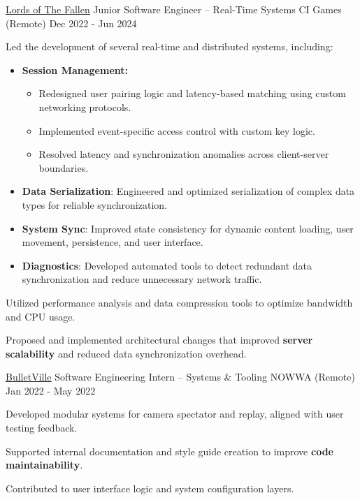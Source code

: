 \begin{cventries}
  \cventry
    {\href{https://wizardcell.com/about/lords-of-the-fallen}{\underline{Lords of The Fallen}}}
    {Junior Software Engineer – Real-Time Systems}
    {CI Games (Remote)}
    {Dec 2022 - Jun 2024}
    {
      \begin{cvitems}
        \item {Led the development of several real-time and distributed systems, including:
          \begin{itemize}
            \item {\textbf{Session Management:}
              \begin{itemize}
                \item {Redesigned user pairing logic and latency-based matching using custom networking protocols.}
                \item {Implemented event-specific access control with custom key logic.}
                \item {Resolved latency and synchronization anomalies across client-server boundaries.}
              \end{itemize}
            }
            \item {\textbf{Data Serialization}: Engineered and optimized serialization of complex data types for reliable synchronization.}
            \item {\textbf{System Sync}: Improved state consistency for dynamic content loading, user movement, persistence, and user interface.}
            \item {\textbf{Diagnostics}: Developed automated tools to detect redundant data synchronization and reduce unnecessary network traffic.}
          \end{itemize}
        }
        \item {Utilized performance analysis and data compression tools to optimize bandwidth and CPU usage.}
        \item {Proposed and implemented architectural changes that improved \textbf{server scalability} and reduced data synchronization overhead.}
      \end{cvitems}
    }

  \cventry
    {\href{https://wizardcell.com/about/bulletville}{\underline{BulletVille}}}
    {Software Engineering Intern – Systems \& Tooling}
    {NOWWA (Remote)}
    {Jan 2022 - May 2022}
    {
      \begin{cvitems}
        \item {Developed modular systems for camera spectator and replay, aligned with user testing feedback.}
        \item {Supported internal documentation and style guide creation to improve \textbf{code maintainability}.}
        \item {Contributed to user interface logic and system configuration layers.}
      \end{cvitems}
    }


\end{cventries}
